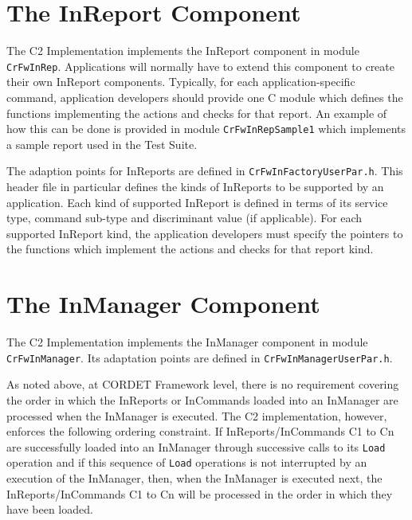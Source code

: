 \documentclass{pnp_article}
\begin{document}
\section{The InReport Component}\label{sec:InReport}


The C2 Implementation implements the InReport component in module \texttt{CrFwInRep}. Applications will normally have to extend this component to create their own InReport components. Typically, for each application-specific command, application developers should provide one C module which defines the functions implementing the actions and checks for that report. An example of how this can be done is provided in module \texttt{CrFwInRepSample1} which implements a sample report used in the Test Suite.

The adaption points for InReports are defined in \texttt{CrFwInFactoryUserPar.h}. This header file in particular defines the kinds of InReports to be supported by an application. Each kind of supported InReport is defined in terms of its service type, command sub-type and discriminant value (if applicable). For each supported InReport kind, the application developers must specify the pointers to the functions which implement the actions and checks for that report kind.


\section{The InManager Component}\label{sec:InManager}


The C2 Implementation implements the InManager component in module \texttt{CrFwInManager}. Its adaptation points are defined in \texttt{CrFwInManagerUserPar.h}.

As noted above, at CORDET Framework level, there is no requirement covering the order in which the InReports or InCommands loaded into an InManager are processed when the InManager is executed. The C2 implementation, however, enforces the following ordering constraint. If InReports/InCommands C1 to Cn are successfully loaded into an InManager through successive calls to its \texttt{Load} operation and if this sequence of \texttt{Load} operations is not interrupted by an execution of the InManager, then, when the InManager is executed next, the InReports/InCommands C1 to Cn will be processed in the order in which they have been loaded.
\end{document}
